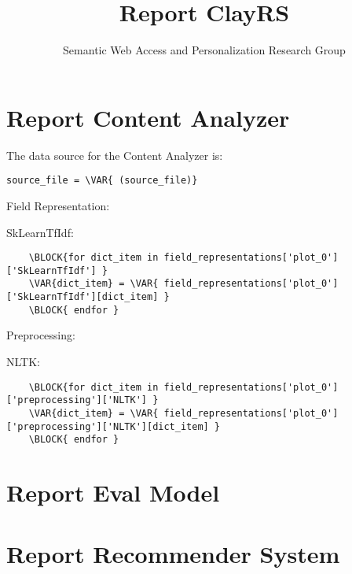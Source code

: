 \documentclass{article}
\title{Report ClayRS}
\author{Semantic Web Access and Personalization Research Group}
\begin{document}
\maketitle


\section{Report Content Analyzer}
The data source for the Content Analyzer is:
\begin{verbatim}source_file = \VAR{ (source_file)}\end{verbatim}
Field Representation:

SkLearnTfIdf:
\begin{verbatim}
    \BLOCK{for dict_item in field_representations['plot_0']['SkLearnTfIdf'] }
    \VAR{dict_item} = \VAR{ field_representations['plot_0']['SkLearnTfIdf'][dict_item] }
    \BLOCK{ endfor }
\end{verbatim}


Preprocessing:

NLTK:
\begin{verbatim}
    \BLOCK{for dict_item in field_representations['plot_0']['preprocessing']['NLTK'] }
    \VAR{dict_item} = \VAR{ field_representations['plot_0']['preprocessing']['NLTK'][dict_item] }
    \BLOCK{ endfor }
\end{verbatim}




\section{Report Eval Model}

\section{Report Recommender System}
\end{document}
